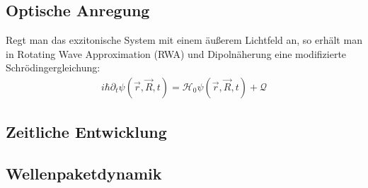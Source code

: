 \subsection{Optische Anregung}\label{kapitel13}
Regt man das exzitonische System mit einem äußerem Lichtfeld an, so erhält man in Rotating Wave Approximation (RWA) und Dipolnäherung eine modifizierte Schrödingergleichung:
\begin{align*}
i\hbar \partial_t \psi(\vec{r},\vec{R},t)=\mathcal{H}_0\psi(\vec{r},\vec{R},t) + \mathcal{Q}
\end{align*}


\subsection{Zeitliche Entwicklung}\label{kapitel14}

\subsection{Wellenpaketdynamik}\label{kapitel15}